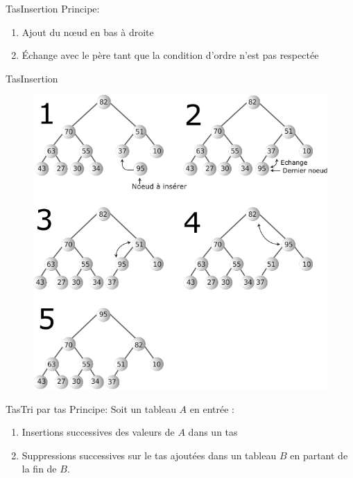 \documentclass[12pt,a4paper]{beamer}
\newcommand{\hl}[1]{\textcolor{blueemph}{#1}}
\begin{document}
\begin{frame}{Tas}{Insertion}
\hl{Principe}: 
\begin{enumerate}
\item Ajout du n\oe ud en bas à droite
\item Échange avec le père tant que la condition d'ordre n'est pas respectée
\end{enumerate}
\end{frame}

\begin{frame}{Tas}{Insertion}
\begin{figure}
\includegraphics[scale=0.65]{figs/heap_insert}
\end{figure}
\end{frame}


\begin{frame}{Tas}{Tri par tas}
\hl{Principe}: 
Soit un tableau $A$ en entrée :
\begin{enumerate}
\item Insertions successives des valeurs de $A$ dans un tas
\item Suppressions successives sur le tas ajoutées dans un tableau $B$ en partant de la fin de $B$. 
\end{enumerate}
\end{frame}
\end{document}
